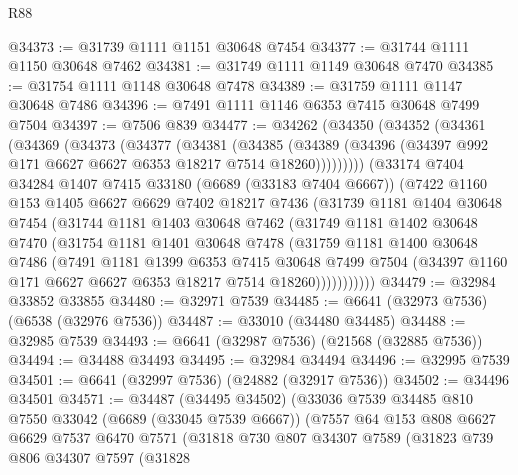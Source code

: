 \begin{lexlean}{R88}
\begin{coremodule}
@34373 := @31739 @1111 @1151 @30648 @7454
@34377 := @31744 @1111 @1150 @30648 @7462
@34381 := @31749 @1111 @1149 @30648 @7470
@34385 := @31754 @1111 @1148 @30648 @7478
@34389 := @31759 @1111 @1147 @30648 @7486
@34396 := @7491 @1111 @1146 @6353 @7415 @30648 @7499 @7504
@34397 := @7506 @839
@34477 := @34262
    (@34350
      (@34352
        (@34361
          (@34369
            (@34373
              (@34377
                (@34381
                  (@34385
                    (@34389 (@34396 (@34397 @992 @171 @6627 @6627 @6353 @18217 @7514 @18260)))))))))
        (@33174
          @7404
          @34284
          @1407
          @7415
          @33180
          (@6689 (@33183 @7404 @6667))
          (@7422
            @1160
            @153
            @1405
            @6627
            @6629
            @7402
            @18217
            @7436
            (@31739
              @1181
              @1404
              @30648
              @7454
              (@31744
                @1181
                @1403
                @30648
                @7462
                (@31749
                  @1181
                  @1402
                  @30648
                  @7470
                  (@31754
                    @1181
                    @1401
                    @30648
                    @7478
                    (@31759
                      @1181
                      @1400
                      @30648
                      @7486
                      (@7491
                        @1181
                        @1399
                        @6353
                        @7415
                        @30648
                        @7499
                        @7504
                        (@34397 @1160 @171 @6627 @6627 @6353 @18217 @7514 @18260)))))))))))
@34479 := @32984 @33852 @33855
@34480 := @32971 @7539
@34485 := @6641 (@32973 @7536) (@6538 (@32976 @7536))
@34487 := @33010 (@34480 @34485)
@34488 := @32985 @7539
@34493 := @6641 (@32987 @7536) (@21568 (@32885 @7536))
@34494 := @34488 @34493
@34495 := @32984 @34494
@34496 := @32995 @7539
@34501 := @6641 (@32997 @7536) (@24882 (@32917 @7536))
@34502 := @34496 @34501
@34571 := @34487
    (@34495 @34502)
    (@33036
      @7539
      @34485
      @810
      @7550
      @33042
      (@6689 (@33045 @7539 @6667))
      (@7557
        @64
        @153
        @808
        @6627
        @6629
        @7537
        @6470
        @7571
        (@31818
          @730
          @807
          @34307
          @7589
          (@31823
            @739
            @806
            @34307
            @7597
            (@31828

\end{coremodule}
\end{lexlean}
